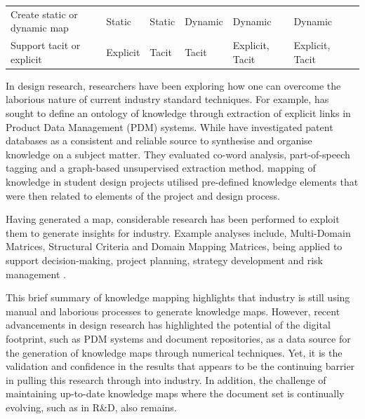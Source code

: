\documentclass[a4paper, 11pt]{article}
\begin{document}
\begin{table}[t!]
\begin{tabular}{p{} | p{} p{} p{} p{} p{} p{0cm}}
    \raggedright Create static or dynamic map &
    \raggedright Static &
    \raggedright Static &
    \raggedright Dynamic &
    \raggedright Dynamic & 
    \raggedright Dynamic &
    \\

    \raggedright Support tacit or explicit &
    \raggedright Explicit &
    \raggedright Tacit &
    \raggedright Tacit &
    \raggedright Explicit, Tacit &
    \raggedright Explicit, Tacit &
    \\

    \bottomrule

  \end{tabular}
\end{table}


In design research, researchers have been exploring how one can overcome the laborious nature of current industry standard techniques.
For example, \textcite{dori2005} has sought to define an ontology of knowledge through extraction of explicit links in Product Data Management (PDM) systems. 
While \textcite{sarica2019,sarica2020} have investigated patent databases as a consistent and reliable source to synthesise and organise knowledge on a subject matter. They evaluated co-word analysis, part-of-speech tagging and a graph-based unsupervised extraction method. 
\textcite{schmidt2015} mapping of knowledge in student design projects utilised pre-defined knowledge elements that were then related to elements of the project and design process. 

Having generated a map, considerable research has been performed to exploit them to generate insights for industry. Example analyses include, Multi-Domain Matrices, Structural Criteria and Domain Mapping Matrices, being applied to support decision-making, project planning, strategy development and risk management \parencite{schmidt2013a,schmidt2013b,von2014}.

This brief summary of knowledge mapping highlights that industry is still using manual and laborious processes to generate knowledge maps. However, recent advancements in design research has highlighted the potential of the digital footprint, such as PDM systems and document repositories, as a data source for the generation of knowledge maps through numerical techniques. Yet, it is the validation and confidence in the results that appears to be the continuing barrier in pulling this research through into industry. In addition, the challenge of maintaining up-to-date knowledge maps where the document set is continually evolving, such as in R\&D, also remains.
\end{document}

